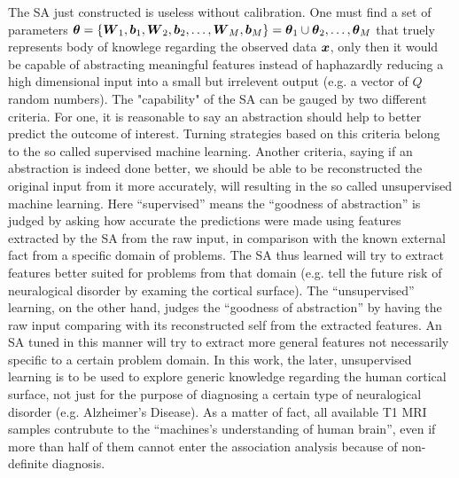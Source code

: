 The SA just constructed is useless without calibration. One must find a set of parameters $\boldsymbol{\theta}=\{\boldsymbol{W}_1, \boldsymbol{b}_1, \boldsymbol{W}_2, \boldsymbol{b}_2, \dots, \boldsymbol{W}_M, \boldsymbol{b}_M\} = \boldsymbol{\theta}_1 \cup \boldsymbol{\theta}_2, \dots, \boldsymbol{\theta}_M$ that truely represents body of knowlege regarding the observed data $\boldsymbol{x}$, only then it would be capable of abstracting meaningful features instead of haphazardly reducing a high dimensional input into a small but irrelevent output (e.g. a vector of $Q$ random numbers). The "capability" of the SA can be gauged by two different criteria. For one, it is reasonable to say an abstraction should help to better predict the outcome of interest. Turning strategies based on this criteria belong to the so called supervised machine learning. Another criteria, saying if an abstraction is indeed done better, we should be able to be reconstructed the original input from it more accurately, will resulting in the so called unsupervised machine learning. Here ``supervised'' means the ``goodness of abstraction'' is judged by asking how accurate the predictions were made using features extracted by the SA from the raw input, in comparison with the known external fact from a specific domain of problems. The SA thus learned will try to extract features better suited for problems from that domain (e.g. tell the future risk of neuralogical disorder by examing the cortical surface). The ``unsupervised'' learning, on the other hand, judges the ``goodness of abstraction'' by having the raw input comparing with its reconstructed self from the extracted features. An SA tuned in this manner will try to extract more general features not necessarily specific to a certain problem domain. In this work, the later, unsupervised learning is to be used to explore generic knowledge regarding the human cortical surface, not just for the purpose of diagnosing a certain type of neuralogical disorder (e.g. Alzheimer's Disease). As a matter of fact, all available T1 MRI samples contrubute to the ``machines's understanding of human brain'', even if more than half of them cannot enter the association analysis because of non-definite diagnosis.

